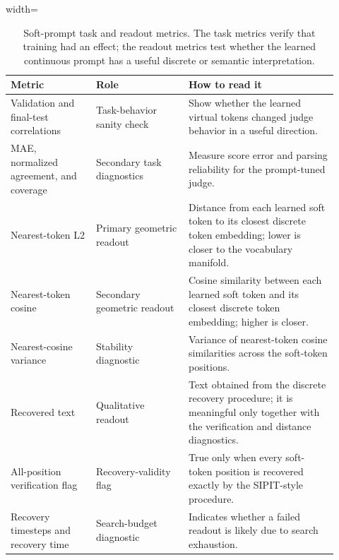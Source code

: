 \documentclass[12pt,a4paper,twoside,openright]{book}
\begin{document}
\begin{table}[!htb]
    \centering
    \scriptsize
    \begin{adjustbox}{width=\textwidth}
    \begin{tabular}{p{0.24\linewidth} p{0.26\linewidth} p{0.42\linewidth}}
        \toprule
        \textbf{Metric} & \textbf{Role} & \textbf{How to read it} \\
        \midrule
        Validation and final-test correlations &
        Task-behavior sanity check &
        Show whether the learned virtual tokens changed judge behavior in a useful direction. \\
        MAE, normalized agreement, and coverage &
        Secondary task diagnostics &
        Measure score error and parsing reliability for the prompt-tuned judge. \\
        Nearest-token L2 &
        Primary geometric readout &
        Distance from each learned soft token to its closest discrete token embedding; lower is closer to the vocabulary manifold. \\
        Nearest-token cosine &
        Secondary geometric readout &
        Cosine similarity between each learned soft token and its closest discrete token embedding; higher is closer. \\
        Nearest-cosine variance &
        Stability diagnostic &
        Variance of nearest-token cosine similarities across the soft-token positions. \\
        Recovered text &
        Qualitative readout &
        Text obtained from the discrete recovery procedure; it is meaningful only together with the verification and distance diagnostics. \\
        All-position verification flag &
        Recovery-validity flag &
        True only when every soft-token position is recovered exactly by the SIPIT-style procedure. \\
        Recovery timesteps and recovery time &
        Search-budget diagnostic &
        Indicates whether a failed readout is likely due to search exhaustion. \\
        \bottomrule
    \end{tabular}
    \end{adjustbox}
    \caption{Soft-prompt task and readout metrics. The task metrics verify that
    training had an effect; the readout metrics test whether the learned
    continuous prompt has a useful discrete or semantic interpretation.}
    \label{tab:soft-prompt-readout-metrics}
\end{table}
\end{document}

